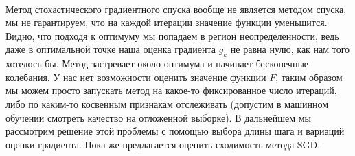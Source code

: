 \\
Метод стохастического градиентного спуска вообще не является методом спуска, мы не гарантируем, что на каждой итерации значение функции уменьшится. Видно, что подходя к оптимуму мы попадаем в регион неопределенности, ведь даже в оптимальной точке наша оценка градиента $g_k$ не равна нулю, как нам того хотелось бы. Метод застревает около оптимума и начинает бесконечные колебания. У нас нет возможности оценить значение функции $F$, таким образом мы можем просто запускать метод на какое-то фиксированное число итераций, либо по каким-то косвенным признакам отслеживать (допустим в машинном обучении смотреть качество на отложенной выборке). В дальнейшем мы рассмотрим решение этой проблемы с помощью выбора длины шага и вариаций оценки градиента. Пока же предлагается оценить сходимость метода SGD.

